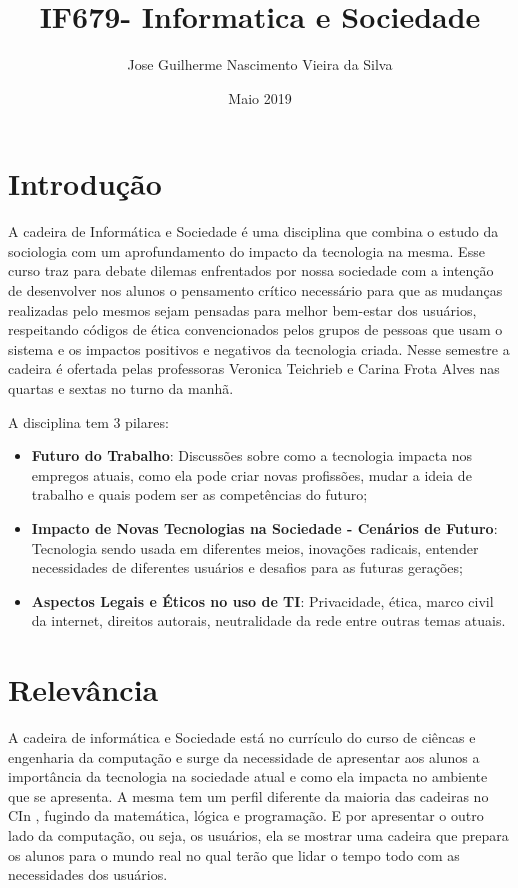 \documentclass[10pt]{article}
\title{IF679- Informatica e Sociedade}
\author{Jose Guilherme Nascimento Vieira da Silva}
\date{Maio 2019}
\begin{document}
\maketitle

\section{Introdução}
A cadeira de Informática e Sociedade é uma disciplina que combina o estudo da sociologia com um aprofundamento do impacto da tecnologia na mesma. Esse curso traz para debate dilemas
enfrentados por nossa sociedade com a intenção de desenvolver nos alunos o pensamento crítico necessário para que as mudanças realizadas pelo mesmos sejam pensadas para melhor bem-estar dos usuários, respeitando códigos de ética convencionados pelos grupos de pessoas que usam o sistema e os impactos positivos e negativos da tecnologia criada. Nesse semestre a cadeira é ofertada pelas professoras Veronica
Teichrieb
e Carina Frota Alves nas quartas e sextas no turno da manhã.

A disciplina tem 3 pilares:


\begin{itemize}
    \item \textbf{Futuro do Trabalho}: Discussões sobre como a
tecnologia impacta nos empregos atuais, como ela pode criar novas profissões, mudar a ideia de trabalho e quais podem ser as competências do futuro;
        
    \item \textbf{Impacto de Novas Tecnologias na Sociedade - Cenários de Futuro}: Tecnologia sendo usada em diferentes meios, inovações radicais, entender necessidades de diferentes usuários e desafios para as futuras gerações;
    
    \item \textbf{Aspectos Legais e Éticos no uso de TI}: Privacidade, ética, marco civil da internet, direitos autorais, neutralidade da rede entre outras temas atuais.
    
\end{itemize}

\section{Relevância}
A cadeira de informática e Sociedade está no currículo do curso de ciêncas
e engenharia da computação e surge da necessidade de apresentar aos alunos a importância da tecnologia na sociedade atual e como ela impacta no ambiente que se apresenta. A mesma tem um perfil diferente da maioria das cadeiras no CIn
, fugindo da matemática, lógica e programação. E por apresentar o outro lado da computação, ou seja, os usuários, ela se mostrar uma cadeira que prepara os alunos para o mundo real no qual terão que lidar o tempo todo com as necessidades dos usuários.
\end{document}

